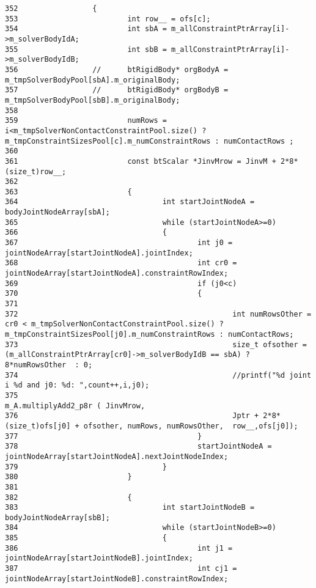 \begin{Code}
\begin{verbatim}
352                 {
353                         int row__ = ofs[c];
354                         int sbA = m_allConstraintPtrArray[i]->m_solverBodyIdA;
355                         int sbB = m_allConstraintPtrArray[i]->m_solverBodyIdB;
356                 //      btRigidBody* orgBodyA = m_tmpSolverBodyPool[sbA].m_originalBody;
357                 //      btRigidBody* orgBodyB = m_tmpSolverBodyPool[sbB].m_originalBody;
358 
359                         numRows = i<m_tmpSolverNonContactConstraintPool.size() ? m_tmpConstraintSizesPool[c].m_numConstraintRows : numContactRows ;
360                                         
361                         const btScalar *JinvMrow = JinvM + 2*8*(size_t)row__;
362 
363                         {
364                                 int startJointNodeA = bodyJointNodeArray[sbA];
365                                 while (startJointNodeA>=0)
366                                 {
367                                         int j0 = jointNodeArray[startJointNodeA].jointIndex;
368                                         int cr0 = jointNodeArray[startJointNodeA].constraintRowIndex;
369                                         if (j0<c)
370                                         {
371                                                                  
372                                                 int numRowsOther = cr0 < m_tmpSolverNonContactConstraintPool.size() ? m_tmpConstraintSizesPool[j0].m_numConstraintRows : numContactRows;
373                                                 size_t ofsother = (m_allConstraintPtrArray[cr0]->m_solverBodyIdB == sbA) ? 8*numRowsOther  : 0;
374                                                 //printf("%d joint i %d and j0: %d: ",count++,i,j0);
375                                                 m_A.multiplyAdd2_p8r ( JinvMrow, 
376                                                 Jptr + 2*8*(size_t)ofs[j0] + ofsother, numRows, numRowsOther,  row__,ofs[j0]);
377                                         }
378                                         startJointNodeA = jointNodeArray[startJointNodeA].nextJointNodeIndex;
379                                 }
380                         }
381 
382                         {
383                                 int startJointNodeB = bodyJointNodeArray[sbB];
384                                 while (startJointNodeB>=0)
385                                 {
386                                         int j1 = jointNodeArray[startJointNodeB].jointIndex;
387                                         int cj1 = jointNodeArray[startJointNodeB].constraintRowIndex;

\end{verbatim}
\end{Code}
